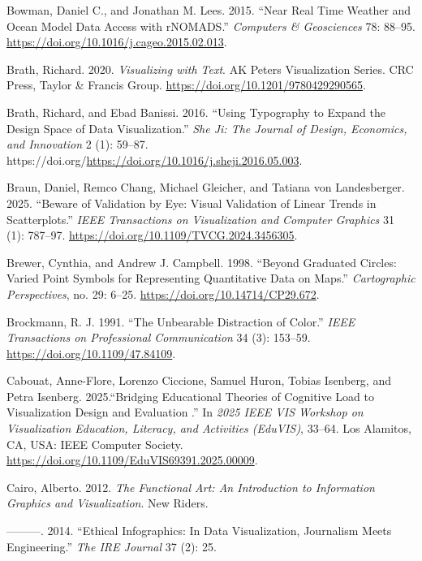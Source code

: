 \documentclass[
  letterpaper,
  DIV=11,
  numbers=noendperiod]{scrreprt}
\newlength{\cslhangindent}
\newenvironment{CSLReferences}[2] %
 {\begin{list}{}{%
  \setlength{\itemindent}{0pt}
  \setlength{\leftmargin}{0pt}
  \setlength{\parsep}{0pt}
  \ifodd #1
   \setlength{\leftmargin}{\cslhangindent}
   \setlength{\itemindent}{-1\cslhangindent}
  \fi
  \setlength{\itemsep}{#2\baselineskip}}}
 {\end{list}}
\begin{document}
\begin{CSLReferences}{1}{0}
Bowman, Daniel C., and Jonathan M. Lees. 2015. {``Near Real Time Weather
and Ocean Model Data Access with {rNOMADS}.''} \emph{Computers \&
Geosciences} 78: 88--95.
\url{https://doi.org/10.1016/j.cageo.2015.02.013}.

Brath, Richard. 2020. \emph{Visualizing with Text}. AK Peters
Visualization Series. CRC Press, Taylor \& Francis Group.
\url{https://doi.org/10.1201/9780429290565}.

Brath, Richard, and Ebad Banissi. 2016. {``Using Typography to Expand
the Design Space of Data Visualization.''} \emph{She Ji: The Journal of
Design, Economics, and Innovation} 2 (1): 59--87.
https://doi.org/\url{https://doi.org/10.1016/j.sheji.2016.05.003}.

Braun, Daniel, Remco Chang, Michael Gleicher, and Tatiana von
Landesberger. 2025. {``Beware of Validation by Eye: Visual Validation of
Linear Trends in Scatterplots.''} \emph{IEEE Transactions on
Visualization and Computer Graphics} 31 (1): 787--97.
\url{https://doi.org/10.1109/TVCG.2024.3456305}.

Brewer, Cynthia, and Andrew J. Campbell. 1998. {``Beyond Graduated
Circles: Varied Point Symbols for Representing Quantitative Data on
Maps.''} \emph{Cartographic Perspectives}, no. 29: 6--25.
\url{https://doi.org/10.14714/CP29.672}.

Brockmann, R. J. 1991. {``The Unbearable Distraction of Color.''}
\emph{IEEE Transactions on Professional Communication} 34 (3): 153--59.
\url{https://doi.org/10.1109/47.84109}.

Cabouat, Anne-Flore, Lorenzo Ciccione, Samuel Huron, Tobias Isenberg,
and Petra Isenberg. 2025.{``{Bridging Educational Theories of Cognitive
Load to Visualization Design and Evaluation }.''} In \emph{2025 IEEE VIS
Workshop on Visualization Education, Literacy, and Activities (EduVIS)},
33--64. Los Alamitos, CA, USA: IEEE Computer Society.
\url{https://doi.org/10.1109/EduVIS69391.2025.00009}.

Cairo, Alberto. 2012. \emph{The Functional Art: An Introduction to
Information Graphics and Visualization}. New Riders.

---------. 2014. {``Ethical Infographics: In Data Visualization,
Journalism Meets Engineering.''} \emph{The IRE Journal} 37 (2): 25.


\end{CSLReferences}
\end{document}
